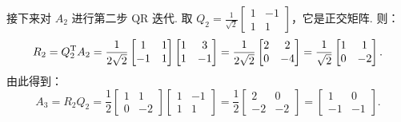 \documentclass{article}
\begin{document}
\begin{solution}
  接下来对 $A_2$ 进行第二步 QR 迭代.
  取 $Q_2 = \frac{1}{\sqrt{2}}
  \begin{bmatrix} 1 & -1 \\ 1 & 1
  \end{bmatrix}$，它是正交矩阵. 则：
  \[
    R_2 = Q_2^{\mathrm{T}} A_2 = \frac{1}{2\sqrt{2}}
    \begin{bmatrix} 1 & 1 \\ -1 & 1
    \end{bmatrix}
    \begin{bmatrix} 1 & 3 \\ 1 & -1
    \end{bmatrix} = \frac{1}{2\sqrt{2}}
    \begin{bmatrix} 2 & 2 \\ 0 & -4
    \end{bmatrix} = \frac{1}{\sqrt{2}}
    \begin{bmatrix} 1 & 1 \\ 0 & -2
    \end{bmatrix}.
  \]
  由此得到：
  \[
    A_3 = R_2 Q_2 = \frac{1}{2}
    \begin{bmatrix} 1 & 1 \\ 0 & -2
    \end{bmatrix}
    \begin{bmatrix} 1 & -1 \\ 1 & 1
    \end{bmatrix} = \frac{1}{2}
    \begin{bmatrix} 2 & 0 \\ -2 & -2
    \end{bmatrix} =
    \begin{bmatrix} 1 & 0 \\ -1 & -1
    \end{bmatrix}.
  \]


\end{solution}
\end{document}
